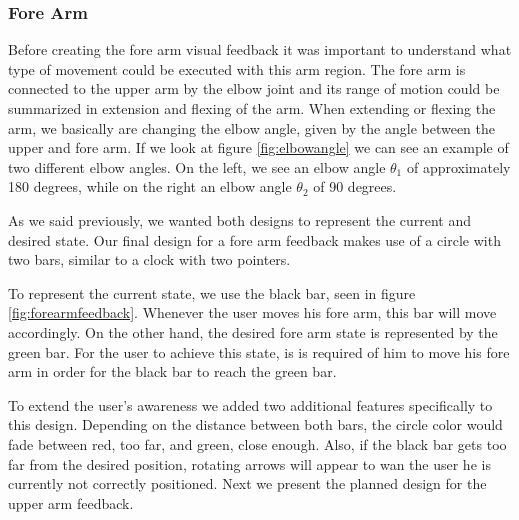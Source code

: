 \subsubsection{Fore Arm}

Before creating the fore arm visual feedback it was important to understand what type of movement could be executed with this arm region.
The fore arm is connected to the upper arm by the elbow joint and its range of motion could be summarized in extension and flexing of the arm.
When extending or flexing the arm, we basically are changing the elbow angle, given by the angle between the upper and fore arm.
If we look at figure \ref{fig:elbowangle} we can see an example of two different elbow angles. 
On the left, we see an elbow angle $\theta$$_1$ of approximately 180 degrees, while on the right an elbow angle $\theta$$_2$ of 90 degrees.  

As we said previously, we wanted both designs to represent the current and desired state. 
Our final design for a fore arm feedback makes use of a circle with two bars, similar to a clock with two pointers.



To represent the current state, we use the black bar, seen in figure \ref{fig:forearmfeedback}. Whenever the user moves his fore arm, this bar will move accordingly.
On the other hand, the desired fore arm state is represented by the green bar. 
For the user to achieve this state, is is required of him to move his fore arm in order for the black bar to reach the green bar.

To extend the user's awareness we added two additional features specifically to this design. 
Depending on the distance between both bars, the circle color would fade between red, too far, and green, close enough. 
Also, if the black bar gets too far from the desired position, rotating arrows will appear to wan the user he is currently not correctly positioned. 
Next we present the planned design for the upper arm feedback.

